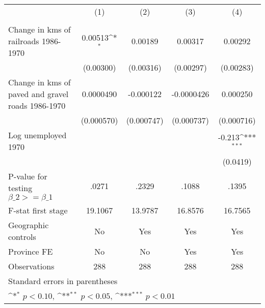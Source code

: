 {
\def\sym#1{\ifmmode^{#1}\else\(^{#1}\)\fi}
\begin{tabular}{l*{4}{c}}
\hline\hline
                &\multicolumn{1}{c}{(1)}&\multicolumn{1}{c}{(2)}&\multicolumn{1}{c}{(3)}&\multicolumn{1}{c}{(4)}\\
                &\multicolumn{1}{c}{}&\multicolumn{1}{c}{}&\multicolumn{1}{c}{}&\multicolumn{1}{c}{}\\
\hline
Change in kms of railroads 1986-1970&  0.00513\sym{*}  &  0.00189         &  0.00317         &  0.00292         \\
                &(0.00300)         &(0.00316)         &(0.00297)         &(0.00283)         \\
[1em]
Change in kms of paved and gravel roads 1986-1970&0.0000490         &-0.000122         &-0.0000426         & 0.000250         \\
                &(0.000570)         &(0.000747)         &(0.000737)         &(0.000716)         \\
[1em]
Log unemployed 1970&                  &                  &                  &   -0.213\sym{***}\\
                &                  &                  &                  & (0.0419)         \\
\hline
P-value for testing $\beta\_{2} >= \beta\_{1}$&    .0271         &    .2329         &    .1088         &    .1395         \\
F-stat first stage&  19.1067         &  13.9787         &  16.8576         &  16.7565         \\
Geographic controls&       No         &      Yes         &      Yes         &      Yes         \\
Province FE     &       No         &       No         &      Yes         &      Yes         \\
Observations    &      288         &      288         &      288         &      288         \\
\hline\hline
\multicolumn{5}{l}{\footnotesize Standard errors in parentheses}\\
\multicolumn{5}{l}{\footnotesize \sym{*} \(p<0.10\), \sym{**} \(p<0.05\), \sym{***} \(p<0.01\)}\\
\end{tabular}
}

